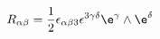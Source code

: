 \begin{equation}
R_{\alpha\beta}
={1\over 2}\epsilon_{\alpha\beta3}\epsilon^{3\gamma\delta}\e^{\gamma}\wedge\e^{\delta}
\end{equation}

